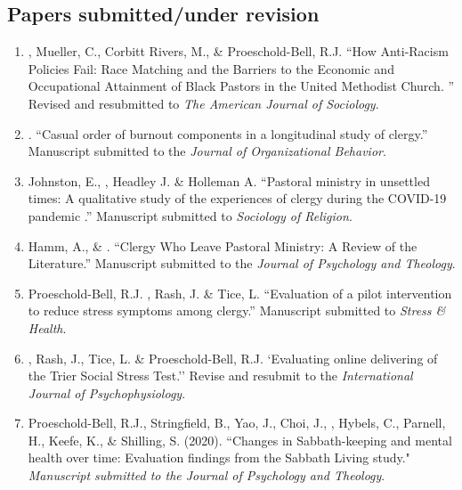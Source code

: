 \subsection*{Papers submitted/under revision}
\begin{enumerate}
\item \Tian, Mueller, C.,  Corbitt Rivers, M., \& Proeschold-Bell, R.J. ``How Anti-Racism Policies Fail: Race Matching and the Barriers to the Economic and Occupational Attainment of Black Pastors in the United Methodist Church. '' Revised and resubmitted to \textit{The American Journal of Sociology}.

\item \Tian. ``Casual order of burnout components in a longitudinal study of clergy.'' Manuscript submitted to the \textit{Journal of Organizational Behavior}.

\item Johnston, E., \Tian, Headley J. \& Holleman A. ``Pastoral ministry in unsettled times:
A qualitative study of the experiences of clergy during the COVID-19 pandemic
.'' Manuscript submitted to \textit{Sociology of Religion}.

\item Hamm, A., \&  \Tian. ``Clergy Who Leave Pastoral Ministry: A Review of the Literature.'' Manuscript submitted to the \textit{Journal of Psychology and Theology}.

\item Proeschold-Bell, R.J. \Tian, Rash, J. \& Tice, L. ``Evaluation of a pilot intervention to reduce stress symptoms among clergy.'' Manuscript submitted to \textit{Stress \& Health}.

\item \Tian, Rash, J., Tice, L. \& Proeschold-Bell, R.J. `Evaluating online delivering of the Trier Social Stress Test.'' Revise and resubmit to the \textit{International Journal of Psychophysiology}.

\item Proeschold-Bell, R.J., Stringfield, B., Yao, J., Choi, J., \Tian, Hybels, C., Parnell, H., Keefe, K., \& Shilling, S. (2020). ``Changes in Sabbath-keeping and mental health over time: Evaluation findings from the Sabbath Living study." \textit{Manuscript submitted to the Journal of Psychology and Theology}.

\end{enumerate}

